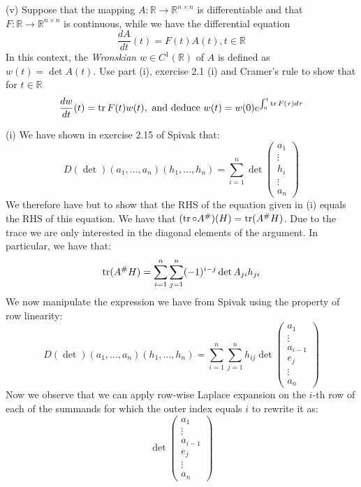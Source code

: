 \begin{exercise}{44}
    (v) Suppose that the mapping $A: \mathbb{R} \rightarrow \mathbb{R}^{n \times n}$ is differentiable and that $F: \mathbb{R} \rightarrow \mathbb{R}^{n \times n}$ is continuous, while we have the differential equation
    $$\frac{dA}{dt}(t) = F(t)A(t), t \in \mathbb{R}$$
    In this context, the \textit{Wronskian} $w \in C^{1}(\mathbb{R})$ of $A$ is defined as $w(t) = \det A(t)$.
    Use part (i), exercise 2.1 (i) and Cramer's rule to show that for $t \in \mathbb{R}$
    $$\frac{dw}{dt}(t) = \operatorname{tr} F(t) w(t), \text{ and deduce } w(t) = w(0)e^{\int_{0}^{t} \operatorname{tr} F(\tau) d\tau}$$
\end{exercise}

\begin{solution}

    (i) We have shown in exercise 2.15 of Spivak that:
    $$D(\det)(a_1, \ldots, a_n)(h_1, \ldots, h_n) = \sum_{i=1}^{n} \det \begin{pmatrix}
        a_1 \\ \vdots \\ h_i \\ \vdots \\ a_n
    \end{pmatrix}$$    
    We therefore have but to show that the RHS of the equation given in (i) equals the RHS of this equation.
    We have that $(\tr \circ A^{\#})(H) = \tr(A^{\#} H)$.
    Due to the trace we are only interested in the diagonal elements of the argument.
    In particular, we have that:
    $$\tr(A^{\#}H) = \sum_{i=1}^{n} \sum_{j=1}^{n} (-1)^{i - j} \det A_{ji} h_{ji}$$
    We now manipulate the expression we have from Spivak using the property of row linearity:
    $$D(\det)(a_1, \ldots, a_n)(h_1, \ldots, h_n) = \sum_{i=1}^{n} \sum_{j=1}^{n} h_{ij} \det \begin{pmatrix}
        a_1 \\ \vdots \\ a_{i-1} \\ e_j \\ \vdots \\ a_n
    \end{pmatrix}$$
    Now we observe that we can apply row-wise Laplace expansion on the $i$-th row of each of the summands for which the outer index equals $i$ to rewrite it as:
    $$\det \begin{pmatrix}
        a_1 \\ \vdots \\ a_{i-1} \\ e_j \\ \vdots \\ a_n

\end{pmatrix}$$
\end{solution}
